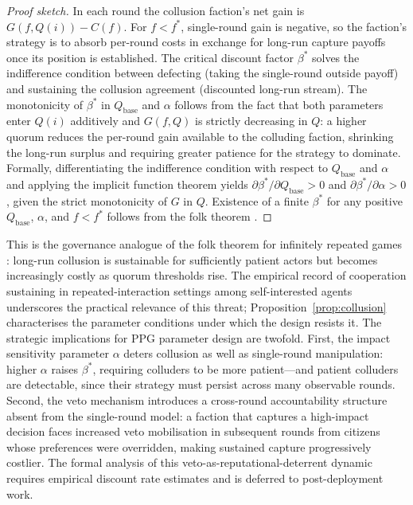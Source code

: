 \documentclass[12pt,a4paper,oneside]{report}
\begin{document}
\begin{proof}[Proof sketch]
In each round the collusion faction's net gain is $G(f, Q(i)) - C(f)$. For $f < f^*$, single-round gain is negative, so the faction's strategy is to absorb per-round costs in exchange for long-run capture payoffs once its position is established. The critical discount factor $\beta^*$ solves the indifference condition between defecting (taking the single-round outside payoff) and sustaining the collusion agreement (discounted long-run stream). The monotonicity of $\beta^*$ in $Q_{\text{base}}$ and $\alpha$ follows from the fact that both parameters enter $Q(i)$ additively and $G(f,Q)$ is strictly decreasing in $Q$: a higher quorum reduces the per-round gain available to the colluding faction, shrinking the long-run surplus and requiring greater patience for the strategy to dominate. Formally, differentiating the indifference condition with respect to $Q_{\text{base}}$ and $\alpha$ and applying the implicit function theorem yields $\partial \beta^*/\partial Q_{\text{base}} > 0$ and $\partial \beta^*/\partial \alpha > 0$, given the strict monotonicity of $G$ in $Q$. Existence of a finite $\beta^*$ for any positive $Q_{\text{base}}$, $\alpha$, and $f < f^*$ follows from the folk theorem \citep{fudenberg1986folk}.
\end{proof}

This is the governance analogue of the folk theorem for infinitely repeated games \citep{fudenberg1986folk}: long-run collusion is sustainable for sufficiently patient actors but becomes increasingly costly as quorum thresholds rise. The empirical record of cooperation sustaining in repeated-interaction settings among self-interested agents \citep{axelrod1984evolution} underscores the practical relevance of this threat; Proposition~\ref{prop:collusion} characterises the parameter conditions under which the design resists it. The strategic implications for PPG parameter design are twofold. First, the impact sensitivity parameter $\alpha$ deters collusion as well as single-round manipulation: higher $\alpha$ raises $\beta^*$, requiring colluders to be more patient---and patient colluders are detectable, since their strategy must persist across many observable rounds. Second, the veto mechanism introduces a cross-round accountability structure absent from the single-round model: a faction that captures a high-impact decision faces increased veto mobilisation in subsequent rounds from citizens whose preferences were overridden, making sustained capture progressively costlier. The formal analysis of this veto-as-reputational-deterrent dynamic requires empirical discount rate estimates and is deferred to post-deployment work.
\end{document}
